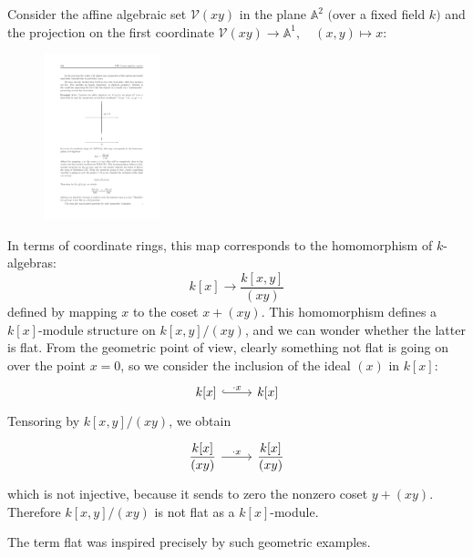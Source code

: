 \begin{example}
Consider the affine algebraic set $\mathscr{V}(xy)$ in the plane $\mathbb{A}^2$ $($over a fixed field $k$$)$ and the projection on the first coordinate $\mathscr{V}(xy)\to\mathbb{A}^1,\quad(x,y)\mapsto x$:
\begin{figure}[htbp]
\centering
\includegraphics[width=0.3\textwidth]{pictures/flat.pdf}
\end{figure}
In terms of coordinate rings, this map corresponds to the homomorphism of $k$-algebras:
\[k[x]\to\dfrac{k[x,y]}{(xy)}\]
defined by mapping $x$ to the coset $x+(xy)$. This homomorphism defines a $k[x]$-module structure on $k[x, y]/(xy)$, and we can wonder whether the latter is flat. From the geometric point of view, clearly something not flat is going on over the point $x=0$, so we consider the inclusion of the ideal $(x)$ in $k[x]$:
\[\begin{tikzcd}
k[x]\ar[r,hook,"\cdot x"]&k[x]
\end{tikzcd}\]
Tensoring by $k[x,y]/(xy)$, we obtain
\[\begin{tikzcd}
\dfrac{k[x]}{(xy)}\ar[r,"\cdot x"]&\dfrac{k[x]}{(xy)}
\end{tikzcd}\]
which is not injective, because it sends to zero the nonzero coset $y+(xy)$. Therefore $k[x,y]/(xy)$ is not flat as a $k[x]$-module.\par
The term flat was inspired precisely by such geometric examples.
\end{example}
